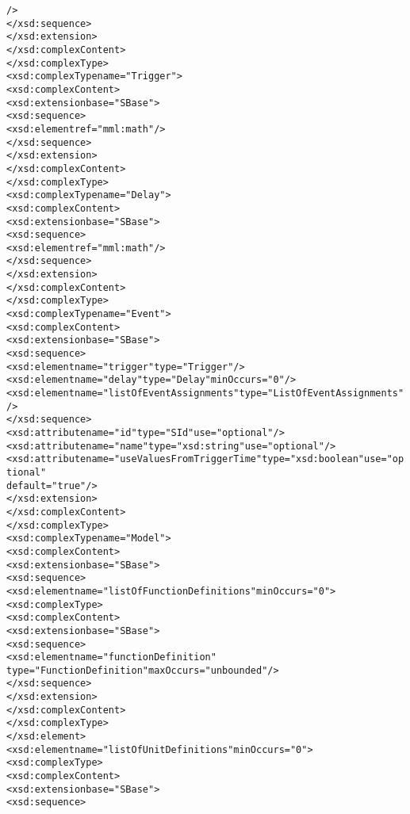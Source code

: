 \begin{alltt}
                    />
                </xsd:sequence>
            </xsd:extension>
        </xsd:complexContent>
    </xsd:complexType>
    <xsd:complexType name="Trigger">
        <xsd:complexContent>
            <xsd:extension base="SBase">
                <xsd:sequence>
                    <xsd:element ref="mml:math"/>
                </xsd:sequence>
            </xsd:extension>
        </xsd:complexContent>
    </xsd:complexType>
    <xsd:complexType name="Delay">
        <xsd:complexContent>
            <xsd:extension base="SBase">
                <xsd:sequence>
                    <xsd:element ref="mml:math"/>
                </xsd:sequence>
            </xsd:extension>
        </xsd:complexContent>
    </xsd:complexType>
    <xsd:complexType name="Event">
        <xsd:complexContent>
            <xsd:extension base="SBase">
                <xsd:sequence>
                    <xsd:element name="trigger" type="Trigger"/>
                    <xsd:element name="delay" type="Delay" minOccurs="0"/>
                    <xsd:element name="listOfEventAssignments" type="ListOfEventAssignments"/>
                </xsd:sequence>
                <xsd:attribute name="id" type="SId" use="optional"/>
                <xsd:attribute name="name" type="xsd:string" use="optional"/>
                <xsd:attribute name="useValuesFromTriggerTime" type="xsd:boolean" use="optional"
                    default="true"/>
            </xsd:extension>
        </xsd:complexContent>
    </xsd:complexType>
    <xsd:complexType name="Model">
        <xsd:complexContent>
            <xsd:extension base="SBase">
                <xsd:sequence>
                    <xsd:element name="listOfFunctionDefinitions" minOccurs="0">
                        <xsd:complexType>
                            <xsd:complexContent>
                                <xsd:extension base="SBase">
                                    <xsd:sequence>
                                        <xsd:element name="functionDefinition"
                                            type="FunctionDefinition" maxOccurs="unbounded"/>
                                    </xsd:sequence>
                                </xsd:extension>
                            </xsd:complexContent>
                        </xsd:complexType>
                    </xsd:element>
                    <xsd:element name="listOfUnitDefinitions" minOccurs="0">
                        <xsd:complexType>
                            <xsd:complexContent>
                                <xsd:extension base="SBase">
                                    <xsd:sequence>

\end{alltt}
